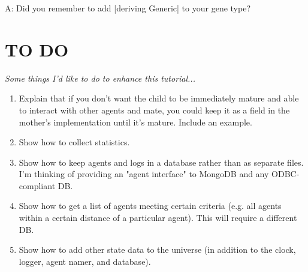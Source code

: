 \documentclass[a4paper,10pt]{report}
\begin{document}
A: Did you remember to add |deriving Generic| to your gene type?

\chapter{TO DO}
\textit{Some things I'd like to do to enhance this tutorial...}

\begin{enumerate}
\item Explain that if you don't want the child to be immediately mature
and able to interact with other agents and mate,
you could keep it as a field in the mother's implementation
until it's mature.
Include an example.

\item Show how to collect statistics.

\item Show how to keep agents and logs in a database rather than as separate
files. I'm thinking of providing an "agent interface" to MongoDB and any
ODBC-compliant DB.

\item Show how to get a list of agents meeting certain criteria 
(e.g. all agents within a certain distance of a particular agent).
This will require a different DB.

\item Show how to add other state data to the universe (in addition to
the clock, logger, agent namer, and database).
\end{enumerate}
\end{document}
